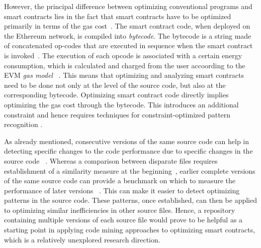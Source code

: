 \documentclass[10pt,conference]{IEEEtran}
\begin{document}
	However, the principal difference between optimizing conventional programs and smart contracts lies in the fact that smart contracts have to be optimized primarily in terms of the gas cost~\cite{superoptimization}. The smart contract code, when deployed on the Ethereum network, is compiled into \textit{bytecode}. The bytecode is a string made of concatenated op-codes that are executed in sequence when the smart contract is invoked~\cite{wood2019ethereum}. The execution of each opcode is associated with a certain energy consumption, which is calculated and charged from the user accoording to the EVM \textit{gas model} ~\cite{wood2019ethereum}. This means that optimizing and analyzing smart contracts need to be done not only at the level of the source code, but also at the corresponding bytecode. Optimizing smart contract code directly implies optimizing the gas cost through the bytecode. This introduces an additional constraint and hence requires techniques for constraint-optimized pattern recognition \cite{utilitypattern}.
	
	As already mentioned, consecutive versions of the same source code can help in detecting specific changes to the code performance due to specific changes in the source code ~\cite{softwareversion}. Whereas a comparison between disparate files requires establishment of a similarity measure at the beginning~\cite{simsimilarity}, earlier complete versions of the same source code can provide a benchmark on which to measure the performance of later versions ~\cite{softwareversion}. This can make it easier to detect optimizing patterns in the source code. These patterns, once established, can then be applied to optimizing similar inefficiencies in other source files. Hence, a repository containing multiple versions of each source file would prove to be helpful as a starting point in applying code mining approaches to optimizing smart contracts, which is a relatively unexplored research direction.
	
\end{document}
